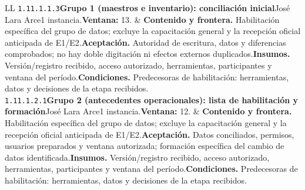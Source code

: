 \begin{longtable}{L{\tabcolsep\relax}L{\tabcolsep\relax}}
\texttt{1.\allowbreak{}11.\allowbreak{}1.\allowbreak{}1.\allowbreak{}3}\newline{}\textbf{Grupo 1 (maestros e inventario): conciliación inicial}\newline{}José Lara Arce\newline{}1 instancia.\newline{}\textbf{Ventana:} 13. & \textbf{Contenido y frontera.} Habilitación específica del grupo de datos; excluye la capacitación general y la recepción oficial anticipada de E1/E2.\newline{}\textbf{Aceptación.} Autoridad de escritura, datos y diferencias comprobados; no hay doble digitación ni efectos externos duplicados.\newline{}\textbf{Insumos.} Versión/registro recibido, acceso autorizado, herramientas, participantes y ventana del período.\newline{}\textbf{Condiciones.} Predecesoras de habilitación: herramientas, datos y decisiones de la etapa recibidos.\\\hline
\texttt{1.\allowbreak{}11.\allowbreak{}1.\allowbreak{}2.\allowbreak{}1}\newline{}\textbf{Grupo 2 (antecedentes operacionales): lista de habilitación y formación}\newline{}José Lara Arce\newline{}1 instancia.\newline{}\textbf{Ventana:} 12. & \textbf{Contenido y frontera.} Habilitación específica del grupo de datos; excluye la capacitación general y la recepción oficial anticipada de E1/E2.\newline{}\textbf{Aceptación.} Datos conciliados, permisos, usuarios preparados y ventana autorizada; formación específica del cambio de datos identificada.\newline{}\textbf{Insumos.} Versión/registro recibido, acceso autorizado, herramientas, participantes y ventana del período.\newline{}\textbf{Condiciones.} Predecesoras de habilitación: herramientas, datos y decisiones de la etapa recibidos.\\\hline

\end{longtable}
